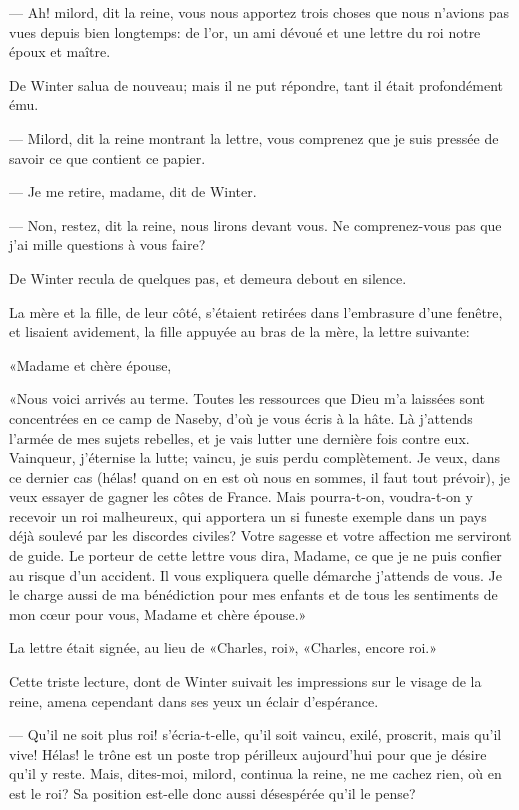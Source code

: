 — Ah! milord, dit la reine, vous nous apportez trois choses que nous n'avions pas vues depuis bien longtemps: de l'or, un ami dévoué et une lettre du roi notre époux et maître.

De Winter salua de nouveau; mais il ne put répondre, tant il était profondément ému.

— Milord, dit la reine montrant la lettre, vous comprenez que je suis pressée de savoir ce que contient ce papier.

— Je me retire, madame, dit de Winter.

— Non, restez, dit la reine, nous lirons devant vous. Ne comprenez-vous pas que j'ai mille questions à vous faire?

De Winter recula de quelques pas, et demeura debout en silence.

La mère et la fille, de leur côté, s'étaient retirées dans l'embrasure d'une fenêtre, et lisaient avidement, la fille appuyée au bras de la mère, la lettre suivante:

«Madame et chère épouse,

«Nous voici arrivés au terme. Toutes les ressources que Dieu m'a laissées sont concentrées en ce camp de Naseby, d'où je vous écris à la hâte. Là j'attends l'armée de mes sujets rebelles, et je vais lutter une dernière fois contre eux. Vainqueur, j'éternise la lutte; vaincu, je suis perdu complètement. Je veux, dans ce dernier cas (hélas! quand on en est où nous en sommes, il faut tout prévoir), je veux essayer de gagner les côtes de France. Mais pourra-t-on, voudra-t-on y recevoir un roi malheureux, qui apportera un si funeste exemple dans un pays déjà soulevé par les discordes civiles? Votre sagesse et votre affection me serviront de guide. Le porteur de cette lettre vous dira, Madame, ce que je ne puis confier au risque d'un accident. Il vous expliquera quelle démarche j'attends de vous. Je le charge aussi de ma bénédiction pour mes enfants et de tous les sentiments de mon cœur pour vous, Madame et chère épouse.»

La lettre était signée, au lieu de «Charles, roi», «Charles, encore roi.»

Cette triste lecture, dont de Winter suivait les impressions sur le visage de la reine, amena cependant dans ses yeux un éclair d'espérance.

— Qu'il ne soit plus roi! s'écria-t-elle, qu'il soit vaincu, exilé, proscrit, mais qu'il vive! Hélas! le trône est un poste trop périlleux aujourd'hui pour que je désire qu'il y reste. Mais, dites-moi, milord, continua la reine, ne me cachez rien, où en est le roi? Sa position est-elle donc aussi désespérée qu'il le pense?

